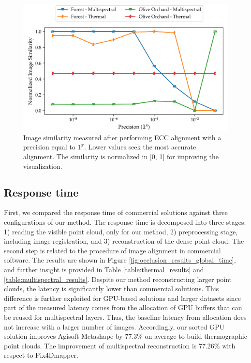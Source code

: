 \begin{figure}[ht]
    \centering
    \includegraphics[width=.9\linewidth]{figs/multi_thermal_projection/results/ecc_precision.png}
    \caption{Image similarity measured after performing ECC alignment with a precision equal to $1^x$. Lower values seek the most accurate alignment. The similarity is normalized in [0, 1] for improving the visualization. }
    \label{fig:ecc_precision}
\end{figure}

\subsection{Response time}

First, we compared the response time of commercial solutions against three configurations of our method. The response time is decomposed into three stages: 1) reading the visible point cloud, only for our method, 2) preprocessing stage, including image registration, and 3) reconstruction of the dense point cloud. The second step is related to the procedure of image alignment in commercial software. The results are shown in Figure \ref{fig:occlusion_results_global_time}, and further insight is provided in Table \ref{table:thermal_results} and \ref{table:multispectral_results}. Despite our method reconstructing larger point clouds, the latency is significantly lower than commercial solutions. This difference is further exploited for GPU-based solutions and larger datasets since part of the measured latency comes from the allocation of GPU buffers that can be reused for multispectral layers. Thus, the baseline latency from allocation does not increase with a larger number of images. Accordingly, our sorted GPU solution improves Agisoft Metashape by 77.3\% on average to build thermographic point clouds. The improvement of multispectral reconstruction is 77.26\% with respect to Pix4Dmapper. 

